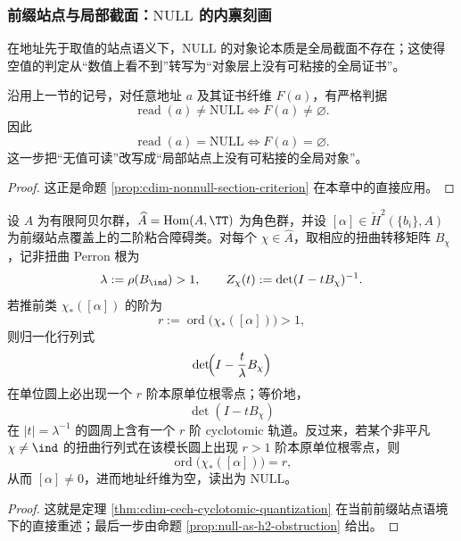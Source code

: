 \subsubsection{前缀站点与局部截面：\texorpdfstring{$\mathrm{NULL}$}{NULL} 的内禀刻画}\label{subsubsec:typed-address-biaxial-completion-prefix-site}
在地址先于取值的站点语义下，\(\mathrm{NULL}\) 的对象论本质是全局截面不存在；这使得空值的判定从“数值上看不到”转写为“对象层上没有可粘接的全局证书”。

\begin{proposition}[局部截面判据]\label{prop:typed-address-biaxial-completion-local-section}
沿用上一节的记号，对任意地址 \(a\) 及其证书纤维 \(F(a)\)，有严格判据
\[
\operatorname{read}(a)\neq \mathrm{NULL}
\iff
F(a)\neq \varnothing.
\]
因此
\[
\operatorname{read}(a)=\mathrm{NULL}
\iff
F(a)=\varnothing.
\]
这一步把“无值可读”改写成“局部站点上没有可粘接的全局对象”。
\end{proposition}
\begin{proof}
这正是命题 \ref{prop:cdim-nonnull-section-criterion} 在本章中的直接应用。
\end{proof}

\begin{theorem}\label{thm:typed-address-biaxial-completion-cech-cyclotomic}
设 \(A\) 为有限阿贝尔群，\(\widehat A=\operatorname{Hom}(A,\TT)\) 为角色群，并设 \([\alpha]\in \check H^2(\{b_i\},A)\) 为前缀站点覆盖上的二阶粘合障碍类。对每个 \(\chi\in\widehat A\)，取相应的扭曲转移矩阵 \(B_\chi\)，记非扭曲 Perron 根为
\[
\lambda:=\rho(B_{\ind})>1,
\qquad
Z_\chi(t):=\det(I-tB_\chi)^{-1}.
\]
若推前类 \(\chi_*([\alpha])\) 的阶为
\[
r:=\operatorname{ord}\bigl(\chi_*([\alpha])\bigr)>1,
\]
则归一化行列式
\[
\det\!\Bigl(I-\frac{t}{\lambda}B_\chi\Bigr)
\]
在单位圆上必出现一个 \(r\) 阶本原单位根零点；等价地，
\[
\det(I-tB_\chi)
\]
在 \(|t|=\lambda^{-1}\) 的圆周上含有一个 \(r\) 阶 cyclotomic 轨道。反过来，若某个非平凡 \(\chi\neq\ind\) 的扭曲行列式在该模长圆上出现 \(r>1\) 阶本原单位根零点，则
\[
\operatorname{ord}\bigl(\chi_*([\alpha])\bigr)=r,
\]
从而 \([\alpha]\neq 0\)，进而地址纤维为空，读出为 \(\mathrm{NULL}\)。
\end{theorem}
\begin{proof}
这就是定理 \ref{thm:cdim-cech-cyclotomic-quantization} 在当前前缀站点语境下的直接重述；最后一步由命题 \ref{prop:null-as-h2-obstruction} 给出。
\end{proof}

